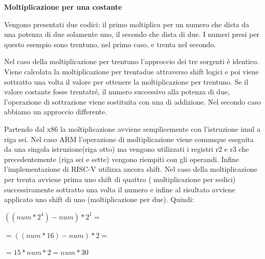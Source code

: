\documentclass[12pt, a4paper]{report}
\begin{document}
\vspace{0.3 cm}

\textbf{Moltiplicazione per una costante}

Vengono presentati due codici: il primo moltiplica per un numero che dista da una potenza di due solamente uno, il secondo che dista di due. I numeri presi per questo esempio sono trentuno, nel primo caso, e trenta nel secondo.

\vspace{0.2 cm }

\begin{figure}[ht]
	\begin{subfigure}[b]{0.4\textwidth}
 
 	
		
 \end{subfigure}
 \hfill
 \begin{subfigure}[b]{0.4\textwidth}
 
 	
		
 \end{subfigure}
 
\end{figure}

\vspace{0.3 cm}
Nel caso della moltiplicazione per trentuno l'approccio dei tre sorgenti è identico. Viene calcolata la moltiplicazione per trentadue attraverso shift logici e poi viene sottratto una volta il valore per ottenere la moltiplicazione per trentuno. Se il valore costante fosse trentatré, il numero successivo alla potenza di due, l'operazione di sottrazione viene sostituita con una di addizione. Nel secondo caso abbiamo un approccio differente.

Partendo dal x86 la moltiplicazione avviene semplicemente con l'istruzione imul a riga sei. Nel caso ARM l'operazione di moltiplicazione viene comunque eseguita da una singola istruzione(riga otto) ma vengono utilizzati i registri r2 e r3 che precedentemente (riga sei e sette) vengono riempiti con gli operandi. Infine l'implementazione di RISC-V utilizza ancora shift. Nel caso della moltiplicazione per trenta avviene prima uno shift di quattro ( moltiplicazione per sedici) successivamente sottratto una volta il numero e infine al risultato avviene applicato uno shift di uno (moltiplicazione per due). Quindi: 
\begin{center}
	\vspace{0.2cm}
$((num * 2^4) - num ) * 2^1 = $ 

$ =((num * 16 ) - num ) * 2 =$ 

$ = 15 * num * 2 = num *30 $ 
\end{center}
\end{document}
